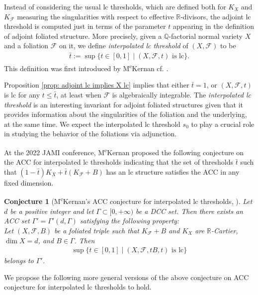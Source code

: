 \documentclass[12pt]{amsart}
\numberwithin{equation}{section}
\newcommand{\Qq}{\mathbb{Q}}
\newcommand{\Rr}{\mathbb{R}}
\newcommand{\Ff}{\mathcal{F}}
\newcommand{\Ii}{\Gamma}
\newtheorem{conj}[thm]{Conjecture}
\theoremstyle{definition}
\theoremstyle{definition}
\theoremstyle{definition}
\begin{document}
Instead of considering the usual lc thresholds, which are defined both for $K_X$ and $K_\mathcal{F}$ measuring the singularities with respect to effective $\Rr$-divisors, the adjoint lc threshold is computed just in terms of the parameter $t$ appearing in the definition of adjoint foliated structure. 
More precisely, given a $\Qq$-factorial normal variety $X$ and a foliation $\mathcal F$ on it, we define \emph{interpolated lc threshold} of $(X,\Ff)$ to be
\begin{align*}
\bar t:=\sup\{t\in [0,1]\mid (X,\Ff,t)\text{ is lc}\}.
\end{align*}
This definition was first introduced by M\textsuperscript{c}Kernan cf. \cite[25:00]{McK22}. 

Proposition \ref{prop: adjoint lc implies X lc} implies that either $\bar t=1$, or $(X,\Ff,t)$ is lc for any $t\leq\bar t$, at least when $\Ff$ is algebraically integrable. 
The \emph{interpolated lc threshold} is an interesting invariant for adjoint foliated structures given that it provides information about the singularities of the foliation and the underlying, at the same time.
We expect the interpolated lc threshold $s_0$ to play a crucial role in studying the behavior of the foliations via adjunction.

At the 2022 JAMI conference, M\textsuperscript{c}Kernan proposed the following conjecture on the ACC for interpolated lc thresholds indicating that the set of thresholds $\bar{t}$ such that $(1-\bar t)K_X+\bar t(K_{\Ff}+B)$ 
has an lc structure satisfies the ACC in any fixed dimension. 

\begin{conj}[M\textsuperscript{c}Kernan's ACC conjecture for interpolated lc thresholds, {\cite[28:22]{McK22}}]\label{conj: mckernan conjecture}
Let $d$ be a positive integer and let $\Ii\subset [0,+\infty)$ be a DCC set. 
Then there exists an ACC set $\Ii'=\Ii'(d, \Ii)$ satisfying the following property: 
\\
Let $(X,\Ff,B)$ be a foliated triple such that $K_{\Ff}+B$ and $K_X$ are $\Rr$-Cartier, $\dim X=d$, and $B\in\Ii$. Then
\begin{align*}
\sup\{t\in [0,1]\mid (X,\Ff,tB,t)\text{ is lc}\}
\end{align*}
belongs to $\Ii'$.
\end{conj}

We propose the following more general versions of the above conjecture on ACC conjecture for interpolated lc thresholds to hold.
\end{document}
